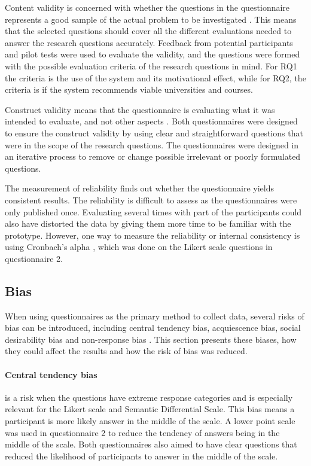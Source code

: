 Content validity is concerned with whether the questions in the questionnaire represents a good sample of the actual problem to be investigated \cite{oates2005researching}. This means that the selected questions should cover all the different evaluations needed to answer the research questions accurately. Feedback from potential participants and pilot tests were used to evaluate the validity, and the questions were formed with the possible evaluation criteria of the research questions in mind. For RQ1 the criteria is the use of the system and its motivational effect, while for RQ2, the criteria is if the system recommends viable universities and courses.

Construct validity means that the questionnaire is evaluating what it was intended to evaluate, and not other aspects \cite{oates2005researching}. Both questionnaires were designed to ensure the construct validity by using clear and straightforward questions that were in the scope of the research questions. The questionnaires were designed in an iterative process to remove or change possible irrelevant or poorly formulated questions. 

The measurement of reliability finds out whether the questionnaire yields consistent results. The reliability is difficult to assess as the questionnaires were only published once. Evaluating several times with part of the participants could also have distorted the data by giving them more time to be familiar with the prototype. However, one way to measure the reliability or internal consistency is using Cronbach's alpha \cite{bland1997statistics}, which was done on the Likert scale questions in questionnaire 2.

\subsection{Bias}

When using questionnaires as the primary method to collect data, several risks of bias can be introduced, including central tendency bias, acquiescence bias, social desirability bias and non-response bias \cite{furnham1986response}. This section presents these biases, how they could affect the results and how the risk of bias was reduced.  

\paragraph{Central tendency bias} is a risk when the questions have extreme response categories and is especially relevant for the Likert scale and Semantic Differential Scale. This bias means a participant is more likely answer in the middle of the scale. A lower point scale was used in questionnaire 2 to reduce the tendency of answers being in the middle of the scale. Both questionnaires also aimed to have clear questions that reduced the likelihood of participants to answer in the middle of the scale.

